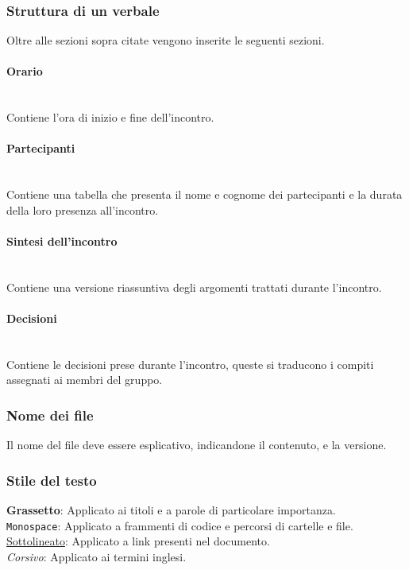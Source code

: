 \documentclass{article}
\begin{document}
\subsubsection{Struttura di un verbale}
Oltre alle sezioni sopra citate vengono inserite le seguenti sezioni.

\paragraph{Orario}~\\
Contiene l'ora di inizio e fine dell'incontro.

\paragraph{Partecipanti}~\\
Contiene una tabella che presenta il nome e cognome dei partecipanti e la durata della loro presenza all'incontro.

\paragraph{Sintesi dell'incontro}~\\
Contiene una versione riassuntiva degli argomenti trattati durante l'incontro.

\paragraph{Decisioni}~\\
Contiene le decisioni prese durante l'incontro, queste si traducono i compiti assegnati ai membri del gruppo.

\subsubsection{Nome dei file}
Il nome del file deve essere esplicativo, indicandone il contenuto, e la versione.

\subsubsection{Stile del testo}
\textbf{Grassetto}: Applicato ai titoli e a parole di particolare importanza. \\
\texttt{Monospace}: Applicato a frammenti di codice e percorsi di cartelle e file. \\
\underline{Sottolineato}: Applicato a link presenti nel documento.\\
\textit{Corsivo}: Applicato ai termini inglesi.
\end{document}
